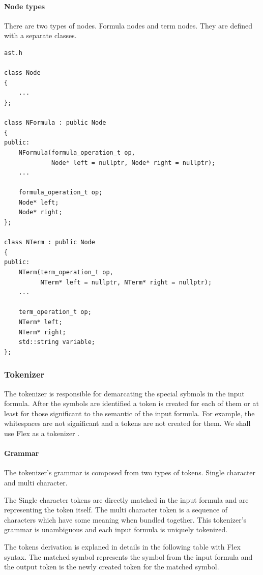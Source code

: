 \documentclass{article}
\begin{document}
	\newpage
	\paragraph{Node types} There are two types of nodes. Formula nodes and term nodes. They are defined with a separate classes.

\begin{lstlisting}
ast.h

class Node
{
    ...
};

class NFormula : public Node
{
public:
    NFormula(formula_operation_t op,
             Node* left = nullptr, Node* right = nullptr);
    ...

    formula_operation_t op;
    Node* left;
    Node* right;
};

class NTerm : public Node
{
public:
    NTerm(term_operation_t op,
          NTerm* left = nullptr, NTerm* right = nullptr);
    ...

    term_operation_t op;
    NTerm* left;
    NTerm* right;
    std::string variable;
};
\end{lstlisting}

	\subsubsection{Tokenizer}
	The tokenizer is responsible for demarcating the special sybmols in the input formula.
	After the symbols are identified a token is created for each of them or at least for those significant to the semantic of the input formula.
	For example, the whitespaces are not significant and a tokens are not created for them.
	We shall use Flex as a tokenizer \cite{flex-tokenizer}.

	\paragraph{Grammar} The tokenizer's grammar is composed from two types of tokens. Single character and multi character.

	The Single character tokens are directly matched in the input formula and are representing the token itself.
	The multi character token is a sequence of characters which have some meaning when bundled together.
	This tokenizer's grammar is unambiguous and each input formula is uniquely tokenized.

	The tokens derivation is explaned in details in the following table with Flex syntax. The matched symbol represents the symbol from the input formula and the output token is the newly created token for the matched symbol.
\end{document}
